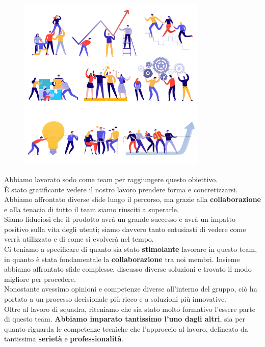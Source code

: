 \documentclass{article}
\begin{document}
	\begin{figure}[H]
		\centering
		\includegraphics[width=0.8\textwidth]{Immagini/31708}
	\end{figure}
	Abbiamo lavorato sodo come team per raggiungere questo obiettivo.\\
	È stato gratificante vedere il nostro lavoro prendere forma e concretizzarsi. 
	\\Abbiamo affrontato diverse sfide lungo il percorso, ma grazie alla \textbf{collaborazione} e alla tenacia di tutto il team siamo riusciti a superarle.\\
	Siamo fiduciosi che il prodotto avrà un grande successo e avrà un impatto positivo sulla vita degli utenti; siamo davvero tanto entusiasti di vedere come verrà utilizzato e di come si evolverà nel tempo.\\
	Ci teniamo a specificare di quanto sia stato \textbf{stimolante} lavorare in questo team, in quanto è stata fondamentale la \textbf{collaborazione} tra noi membri. Insieme abbiamo affrontato sfide complesse, discusso diverse soluzioni e trovato il modo migliore per procedere.
	\\
	Nonostante avessimo opinioni e competenze diverse all’interno del gruppo, ciò ha portato a un processo decisionale più ricco e a soluzioni più innovative.\\
	Oltre al lavoro di squadra, riteniamo che sia stato molto formativo l'essere parte di questo team.
	\textbf{Abbiamo imparato tantissimo l’uno dagli altri}, sia per quanto riguarda le competenze tecniche che l’approccio al lavoro, delineato da tantissima \textbf{serietà} e \textbf{professionalità}.\\
\end{document}
